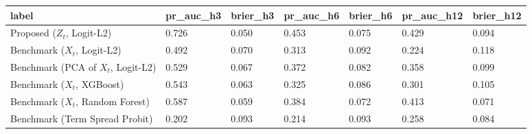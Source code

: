 \begin{tabular}{lllllll}
\toprule
label & pr_auc_h3 & brier_h3 & pr_auc_h6 & brier_h6 & pr_auc_h12 & brier_h12 \\
\midrule
Proposed ($Z_t$, Logit-L2) & 0.726 & 0.050 & 0.453 & 0.075 & 0.429 & 0.094 \\
Benchmark ($X_t$, Logit-L2) & 0.492 & 0.070 & 0.313 & 0.092 & 0.224 & 0.118 \\
Benchmark (PCA of $X_t$, Logit-L2) & 0.529 & 0.067 & 0.372 & 0.082 & 0.358 & 0.099 \\
Benchmark ($X_t$, XGBoost) & 0.543 & 0.063 & 0.325 & 0.086 & 0.301 & 0.105 \\
Benchmark ($X_t$, Random Forest) & 0.587 & 0.059 & 0.384 & 0.072 & 0.413 & 0.071 \\
Benchmark (Term Spread Probit) & 0.202 & 0.093 & 0.214 & 0.093 & 0.258 & 0.084 \\
\bottomrule
\end{tabular}
